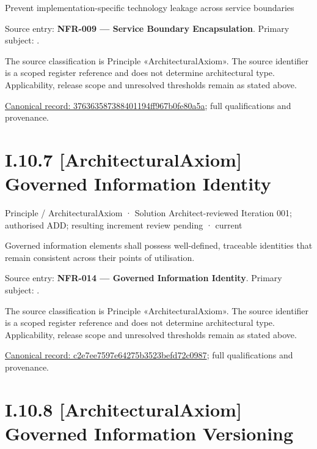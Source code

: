 Prevent implementation-specific technology leakage across service boundaries



Source entry: \textbf{NFR-009 — Service Boundary Encapsulation}. Primary subject: \texttt{}.



The source classification is Principle «ArchitecturalAxiom». The source identifier is a scoped register reference and does not determine architectural type. Applicability, release scope and unresolved thresholds remain as stated above.


{\footnotesize \href{../../../../continuum/motivation/principle/architectural-axiom/376363587388401194ff967b0fe80a5a.md}{Canonical record: 376363587388401194ff967b0fe80a5a}; full qualifications and provenance.}\par
\section*{I.10.7 [ArchitecturalAxiom] Governed Information Identity}
\label{navigation:I.10.7}

\label{element:c2e7ee7597e64275b3523befd72c0987}
{\small Principle / ArchitecturalAxiom · Solution Architect-reviewed Iteration 001; authorised ADD; resulting increment review pending · current}\par

Governed information elements shall possess well-defined, traceable identities that remain consistent across their points of utilisation.



Source entry: \textbf{NFR-014 — Governed Information Identity}. Primary subject: \texttt{}.



The source classification is Principle «ArchitecturalAxiom». The source identifier is a scoped register reference and does not determine architectural type. Applicability, release scope and unresolved thresholds remain as stated above.


{\footnotesize \href{../../../../continuum/motivation/principle/architectural-axiom/c2e7ee7597e64275b3523befd72c0987.md}{Canonical record: c2e7ee7597e64275b3523befd72c0987}; full qualifications and provenance.}\par
\section*{I.10.8 [ArchitecturalAxiom] Governed Information Versioning}
\label{navigation:I.10.8}

